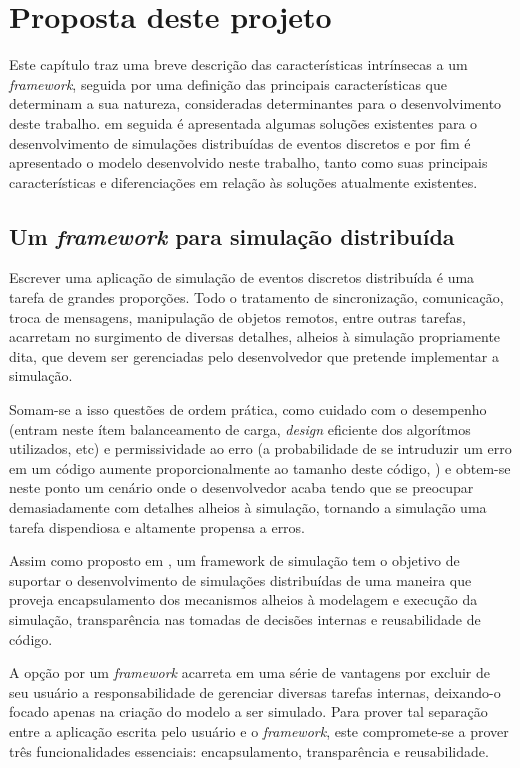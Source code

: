 \chapter{Proposta deste projeto}

Este capítulo traz uma breve descrição das características intrínsecas a um \textit{framework}, seguida por uma definição das principais características que determinam a sua natureza, consideradas determinantes para o desenvolvimento deste trabalho. em seguida é apresentada algumas soluções existentes para o desenvolvimento de simulações distribuídas de eventos discretos e por fim é apresentado o modelo desenvolvido neste trabalho, tanto como suas principais características e diferenciações em relação às soluções atualmente existentes.

\section{Um \textit{framework} para simulação distribuída}

Escrever uma aplicação de simulação de eventos discretos distribuída é uma tarefa de grandes proporções. Todo o tratamento de sincronização, comunicação, troca de mensagens, manipulação de objetos remotos, entre outras tarefas, acarretam no surgimento de diversas detalhes, alheios à simulação propriamente dita, que devem ser gerenciadas pelo desenvolvedor que pretende implementar a simulação.

Somam-se a isso questões de ordem prática, como cuidado com o desempenho (entram neste ítem balanceamento de carga, \textit{design} eficiente dos algorítmos utilizados, etc) e permissividade ao erro (a probabilidade de se intruduzir um erro em um código aumente proporcionalmente ao tamanho deste código, \cite{HONGYU09}) e obtem-se neste ponto um cenário onde o desenvolvedor acaba tendo que se preocupar demasiadamente com detalhes alheios à simulação, tornando a simulação uma tarefa dispendiosa e altamente propensa a erros.

Assim como proposto em \cite{LIVERSON}, um framework de simulação tem o objetivo de suportar o desenvolvimento de simulações distribuídas de uma maneira que proveja encapsulamento dos mecanismos alheios à modelagem e execução da simulação, transparência nas tomadas de decisões internas e reusabilidade de código.

A opção por um \textit{framework} acarreta em uma série de vantagens por excluir de seu usuário a responsabilidade de gerenciar diversas tarefas internas, deixando-o focado apenas na criação do modelo a ser simulado. Para prover tal separação entre a aplicação escrita pelo usuário e o \textit{framework}, este compromete-se a prover três funcionalidades essenciais: encapsulamento, transparência e reusabilidade.

